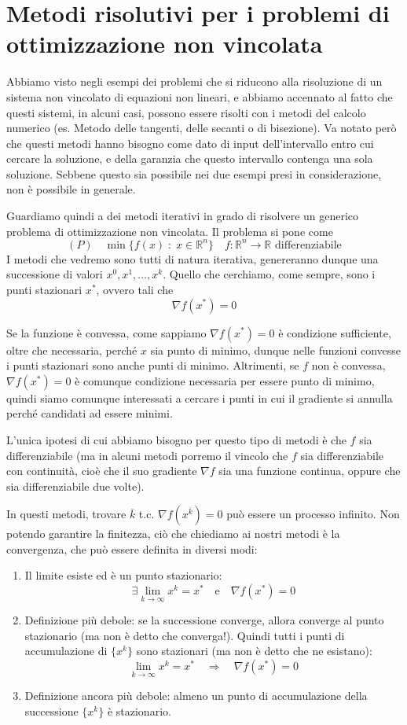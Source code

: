 \section{Metodi risolutivi per i problemi di ottimizzazione non
vincolata} Abbiamo visto negli esempi dei problemi che si riducono
alla risoluzione di un sistema non vincolato di equazioni non lineari,
e abbiamo accennato al fatto che questi sistemi, in alcuni casi,
possono essere risolti con i metodi del calcolo numerico (es. Metodo
delle tangenti, delle secanti o di bisezione). Va notato però che
questi metodi hanno bisogno come dato di input dell'intervallo entro
cui cercare la soluzione, e della garanzia che questo intervallo
contenga una sola soluzione. Sebbene questo sia possibile nei due
esempi presi in considerazione, non \`e possibile in generale.

Guardiamo quindi a dei metodi iterativi in grado di risolvere un
generico problema di ottimizzazione non vincolata. Il problema si pone
come
$$ (P) \quad \min\{f(x)\; : \; x \in \mathbb{R}^n\} \quad f: \mathbb{R}^n  \rightarrow \mathbb{R} \text{ differenziabile}$$
I metodi che vedremo sono tutti di natura iterativa, genereranno
dunque una successione di valori $ x^0, x^1, \ldots, x^k$. Quello che
cerchiamo, come sempre, sono i punti stazionari $x^{*}$, ovvero tali
che
$$\nabla f(x^{*}) = 0$$

Se la funzione \`e convessa, come sappiamo $\nabla f(x^{*}) = 0$ \`e
condizione sufficiente, oltre che necessaria, perch\'e $x$ sia punto di
minimo, dunque nelle funzioni convesse i punti stazionari sono anche
punti di minimo. Altrimenti, se $f$ non \`e convessa,$\nabla f(x^{*}) =
0$ \`e comunque condizione necessaria per essere punto di minimo, quindi
siamo comunque interessati a cercare i punti in cui il gradiente si
annulla perch\'e candidati ad essere minimi.

L'unica ipotesi di cui abbiamo bisogno per questo tipo di metodi \`e che
$f$ sia differenziabile (ma in alcuni metodi porremo il vincolo che
$f$ sia differenziabile con continuit\`a, cio\`e che il suo gradiente
$\nabla f$ sia una funzione continua, oppure che sia differenziabile
due volte).

In questi metodi, trovare $\overline{k}$ t.c. $\nabla
f(x^{\overline{k}}) = 0$ può essere un processo infinito. Non potendo
garantire la finitezza, ciò che chiediamo ai nostri metodi \`e la
convergenza, che può essere definita in diversi modi:

\begin{enumerate}
\item Il limite esiste ed \`e un punto stazionario: $$\exists \lim_{k
\to \infty} x^{k} = x^{*} \quad \text{e} \quad \nabla f(x^{*}) = 0$$
\item Definizione pi\`u debole: se la successione converge, allora
converge al punto stazionario (ma non \`e detto che converga!). Quindi
tutti i punti di accumulazione di $\{x^k\}$ sono stazionari (ma non \`e
detto che ne esistano): $$\lim_{k \to \infty} x^{k} = x^{*} \quad
\Longrightarrow \quad \nabla f(x^{*}) = 0$$
\item Definizione ancora pi\`u debole: almeno un punto di accumulazione
della successione $\{x^k\}$ \`e stazionario.
\end{enumerate}


